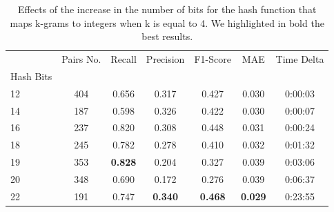 \documentclass[runningheads]{llncs}
\begin{document}
\begin{table}
  \caption{Effects of the increase in the number of bits for the hash function that maps k-grams to integers when k is equal to 4. We highlighted in bold the best results.}
  \label{tab:experiments:buckets_k4}
  \centering
  \begin{tabular}{lcccccc}
    \toprule
    {} &  Pairs No. &  Recall &  Precision &  F1-Score &    MAE & Time Delta \\
    Hash Bits &            &         &            &           &        &            \\
    \midrule
    12        &        404 &   0.656 &      0.317 &     0.427 &  0.030 &    0:00:03 \\
    14        &        187 &   0.598 &      0.326 &     0.422 &  0.030 &    0:00:07 \\
    16        &        237 &   0.820 &      0.308 &     0.448 &  0.031 &    0:00:24 \\
    18        &        245 &   0.782 &      0.278 &     0.410 &  0.032 &    0:01:32 \\
    19        &        353 &   \textbf{0.828} &      0.204 &     0.327 &  0.039 &    0:03:06 \\
    20        &        348 &   0.690 &      0.172 &     0.276 &  0.039 &    0:06:37 \\
    22        &        191 &   0.747 &      \textbf{0.340} &     \textbf{0.468} &  \textbf{0.029} &    0:23:55 \\
    \bottomrule
    \end{tabular}
\end{table}
\end{document}
